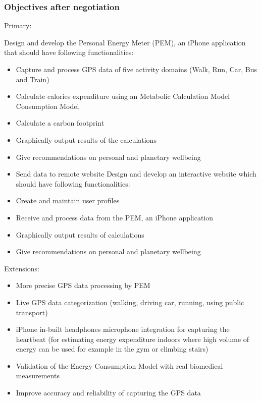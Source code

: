 \documentclass[12pt, a4paper]{report}   %
\begin{document}
\begin{enumerate}
\subsubsection*{Objectives after negotiation}
Primary:
	\begin{itemize}
		Design and develop the Personal Energy Meter (PEM), an iPhone application that 		should 	have following functionalities:
	\end{itemize}
	\begin{itemize}
		\begin{itemize}
			\item Capture and process GPS data of five activity domains (Walk, Run, Car, Bus and Train)
			\item Calculate calories expenditure using an Metabolic Calculation Model Consumption Model
			\item Calculate a carbon footprint
			\item Graphically output results of the calculations
			\item Give recommendations on personal and planetary wellbeing
			\item Send data to remote website
Design and develop an interactive website which should have following functionalities:
			\item Create and maintain user profiles
			\item Receive and process data from the PEM, an iPhone application
			\item Graphically output results of calculations
			\item Give recommendations on personal and planetary wellbeing
		\end{itemize}
	\end{itemize}
Extensions: 
	\begin{itemize}
		\begin{itemize}
			\item More precise GPS data processing by PEM
			\item Live GPS data categorization (walking, driving car, running, using public transport)
			\item iPhone in-built headphones microphone integration for capturing the heartbeat (for estimating energy expenditure indoors where high volume of energy can be used for example in the gym or climbing stairs)
			\item Validation of the Energy Consumption Model with real biomedical measurements
			\item Improve accuracy and reliability of capturing the GPS data

\end{itemize}
\end{itemize}
\end{enumerate}
\end{document}
